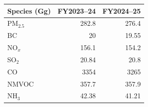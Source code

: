 \begin{tabular}{@{}lrr@{}}\toprule
Species (Gg) & FY2023--24 & FY2024--25\\\midrule
PM$_{2.5}$ & 282.8 & 276.4 \\
BC & 20 & 19.55 \\
NO$_x$ & 156.1 & 154.2 \\
SO$_2$ & 20.84 & 20.8 \\
CO & 3354 & 3265 \\
NMVOC & 357.7 & 357.9 \\
NH$_3$ & 42.38 & 41.21 \\
\bottomrule\end{tabular}
